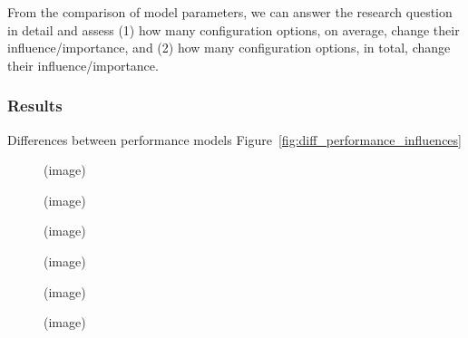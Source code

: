 From the comparison of model parameters, we can answer the research question in detail and assess (1) how many configuration options, on average, change their influence/importance, and (2) how many configuration options, in total, change their influence/importance.

\subsubsection{Results} {\color{blue} Differences between performance models Figure~\ref{fig:diff_performance_influences}}\\

\begin{figure*}
	\centering
	\begin{subfigure}{0.33\textwidth}
		\centering
		(image)
		\caption{\batik}
	\end{subfigure}
	\begin{subfigure}{0.33\textwidth}
		\centering
		(image)
		\caption{\dconvert}
	\end{subfigure}
	\begin{subfigure}{0.33\textwidth}
		\centering
		(image)
		\caption{\htwo}
	\end{subfigure}
	\begin{subfigure}{0.33\textwidth}
		\centering
		(image)
		\caption{\jumper}
	\end{subfigure}
	\begin{subfigure}{0.33\textwidth}
		\centering
		(image)
		\caption{\jadx}
	\end{subfigure}
	\begin{subfigure}{0.33\textwidth}
		\centering
		(image)
		\caption{\kanzi}
	\end{subfigure}
	\caption{Differences in performance influence (linear model) / importance (random forest model)}
	\label{fig:diff_performance_influences}
\end{figure*}


